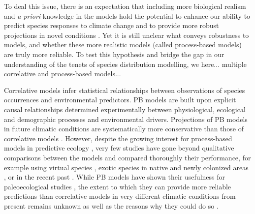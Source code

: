 To deal this issue, there is an expectation that including more biological realism and \emph{a priori} knowledge in the models hold the potential to enhance our ability to predict species responses to climate change and to provide more robust projections in novel conditions \cite{Evans2012, Singer2016}. Yet it is still unclear what conveys robustness to models, and whether these more realistic models (called process-based models) are truly more reliable. To test this hypothesis and bridge the gap in our understanding of the tenets of species distribution modelling, we here... multiple correlative and process-based models...

\begin{comment} 
There exist a variety of models used to predict the geographical distribution of species, from correlative models to more mechanistic models called process-based (PB) models \cite{Dormann2012}. 
\end{comment}
Correlative models infer statistical relationships between observations of species occurrences and environmental predictors. PB models are built upon explicit causal relationships determined experimentally between physiological, ecological and demographic processes and environmental drivers. Projections of PB models in future climatic conditions are systematically more conservative than those of correlative models \cite{Morin2009, Cheaib2012, Gritti2013}. However, despite the growing interest for process-based models in predictive ecology \cite{Connolly2017, Urban2016, Pilowsky2022}, very few studies have gone beyond qualitative comparisons between the models and compared thoroughly their performance, for example using virtual species \cite{Zurell2016}, exotic species in native and newly colonized areas \cite{Higgins2020}, or in the recent past \cite{Fordham2018}. While PB models have shown their usefulness for paleoecological studies \cite{Saltre2013, Ruosch2016, Schwoerer2014}, the extent to which they can provide more reliable predictions than correlative models in very different climatic conditions from present remains unknown as well as the reasons why they could do so \cite{UribeRivera2022, Briscoe2019}.
\begin{comment} 
Bridging this gap through a comprehensive evaluation of the different class of models is crucial \cite{Evans2016}, given that process-based models hold the potential to enhance our ability to predict species responses to climate change and to provide more robust projections in novel conditions \cite{Evans2012, Singer2016}. 
\end{comment}

